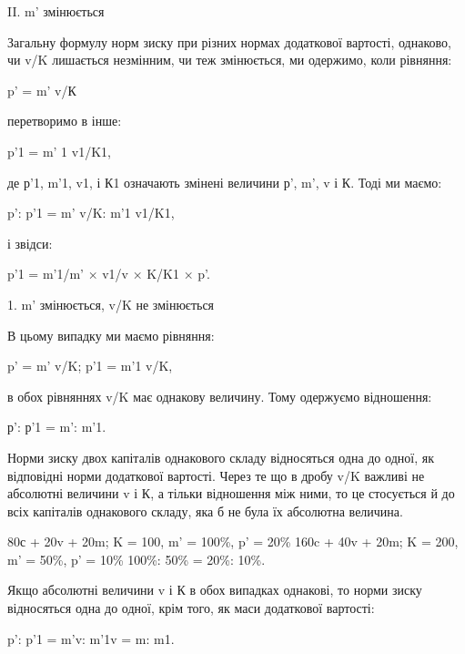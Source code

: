 II. m' змінюється

Загальну формулу норм зиску при різних нормах додаткової
вартості, однаково, чи  v/K лишається незмінним, чи теж змінюється,
ми одержимо, коли рівняння:

p' = m' v/К

перетворимо в інше:

p'1 = m' 1 v1/K1,

де р'1, m'1, v1, і К1 означають змінені величини р', m', v і К.
Тоді ми маємо:

p': p'1 = m' v/K: m'1 v1/K1,

і звідси:

p'1 = m'1/m' × v1/v × K/K1 × p'.

1. m' змінюється, v/K не змінюється

В цьому випадку ми маємо рівняння:

p' = m' v/K; p'1 = m'1 v/K,

в обох рівняннях v/K має однакову величину. Тому одержуємо
відношення:

р': р'1 = m': m'1.

Норми зиску двох капіталів однакового складу відносяться
одна до одної, як відповідні норми додаткової вартості. Через
те що в дробу v/K важливі не абсолютні величини v і К, а тільки
відношення між ними, то це стосується й до всіх капіталів однакового
складу, яка б не була їх абсолютна величина.

80с + 20v + 20m; K = 100, m' = 100\%, p' = 20\%
160c + 40v + 20m; K = 200, m' = 50\%, p' = 10\%
100\%: 50\% = 20\%: 10\%.

Якщо абсолютні величини v і К в обох випадках однакові,
то норми зиску відносяться одна до одної, крім того, як маси
додаткової вартості:

p': p'1 = m'v: m'1v = m: m1.
